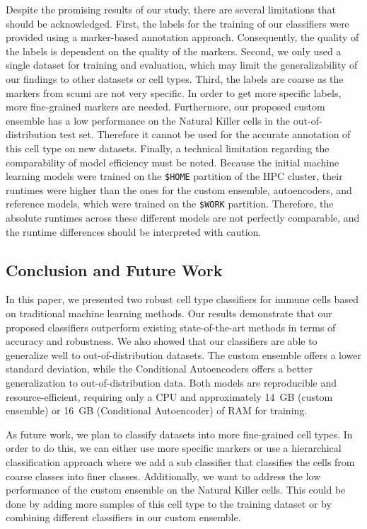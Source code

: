 \documentclass[11pt]{article}
\begin{document}
Despite the promising results of our study, there are several limitations that should be acknowledged. First, the labels for the training of our classifiers were provided using a marker-based annotation approach. Consequently, the quality of the labels is dependent on the quality of the markers. 
Second, we only used a single dataset for training and evaluation, which may limit the generalizability of our findings to other datasets or cell types.
Third, the labels are coarse as the markers from scumi are not very specific. In order to get more specific labels, more fine-grained markers are needed.
Furthermore, our proposed custom ensemble has a low performance on the Natural Killer cells in the out-of-distribution test set. Therefore it cannot be used for the accurate annotation of this cell type on new datasets.
Finally, a technical limitation regarding the comparability of model efficiency must be noted. Because the initial machine learning models were trained on the \texttt{\$HOME} partition of the HPC cluster, their runtimes were higher than the ones for the custom ensemble, autoencoders, and reference models, which were trained on the \texttt{\$WORK} partition. Therefore, the absolute runtimes across these different models are not perfectly comparable, and the runtime differences should be interpreted with caution.


\subsection{Conclusion and Future Work}\label{sec:discussion:conclusion}

In this paper, we presented two robust cell type classifiers for immune cells based on traditional machine learning methods. Our results demonstrate that our proposed classifiers outperform existing state-of-the-art methods in terms of accuracy and robustness. We also showed that our classifiers are able to generalize well to out-of-distribution datasets. The custom ensemble offers a lower standard deviation, while the Conditional Autoencoders offers a better generalization to out-of-distribution data. Both models are reproducible and resource-efficient, requiring only a CPU and approximately 14~GB (custom ensemble) or 16~GB (Conditional Autoencoder) of RAM for training.

As future work, we plan to classify datasets into more fine-grained cell types. In order to do this, we can either use more specific markers or use a hierarchical classification approach where we add a sub classifier that classifies the cells from coarse classes into finer classes. Additionally, we want to address the low performance of the custom ensemble on the Natural Killer cells. This could be done by adding more samples of this cell type to the training dataset or by combining different classifiers in our custom ensemble.
\end{document}
